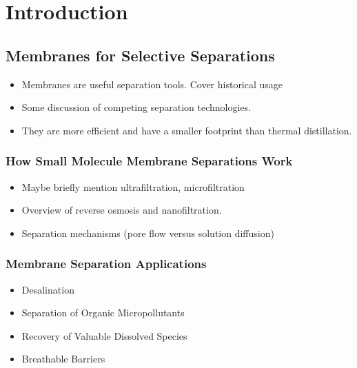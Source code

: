 \chapter{Introduction}\label{chapter:intro}

  \section{Membranes for Selective Separations}
  
  \begin{itemize}
  
    \item Membranes are useful separation tools. Cover historical usage
	\item Some discussion of competing separation technologies. 
	\item They are more efficient and have a smaller footprint than thermal distillation.

  \end{itemize}
  
  \subsection{How Small Molecule Membrane Separations Work}

  \begin{itemize}
  
    \item Maybe briefly mention ultrafiltration, microfiltration
    \item Overview of reverse osmosis and nanofiltration.
    \item Separation mechanisms (pore flow versus solution diffusion)
  
  \end{itemize}
  
  \subsection{Membrane Separation Applications}
  
  \begin{itemize}
  	\item Desalination
  	\item Separation of Organic Micropollutants
  	\item Recovery of Valuable Dissolved Species
  	\item Breathable Barriers
  \end{itemize}


